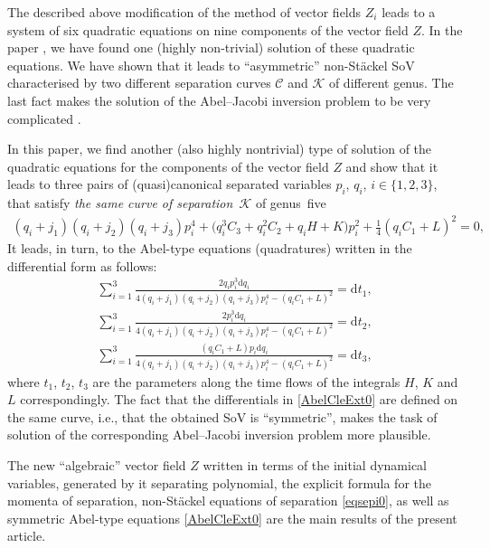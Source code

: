 \documentclass[pdftex]{sigma}
\numberwithin{equation}{section}
\begin{document}
 The described above modification of the method of vector fields $Z_i$ leads to a system of six quadratic equations on nine components of the vector field $Z$. In the paper \cite{SkrAsSoVExCle}, we have found one (highly non-trivial) solution of these quadratic equations. We have shown that it leads to ``asymmetric'' non-St\"ackel SoV characterised by two different separation curves $\mathcal{C}$ and $\mathcal{K}$ of different genus. The last fact makes the solution of the Abel--Jacobi inversion problem to be very complicated \cite{FedMagSkr2}.

 In this paper, we find another (also highly nontrivial) type of solution of the quadratic equations for the components of the vector field $Z$ and show that it leads to three pairs of (quasi)canonical separated variables $p_i$, $q_i$, $i\in \{1,2,3\}$, that
satisfy {\it the same curve of separation}~$\mathcal{K}$ of genus~five
\begin{gather}
(q_i+j_1)(q_i+j_2)(q_i+j_3) p_i^4+\big(q_i^3 C_3+q_i^2 C_2+ q_i H+K \big) p_i^2+ \frac{1}{4}(q_i C_1+L)^2=0,
\label{eqsepi0}
\end{gather}
It leads, in turn, to the Abel-type equations (quadratures) written in the differential form as follows:
\begin{subequations}\label{AbelCleExt0}
\begin{gather}
\sum\limits_{i=1}^3 \frac{2 q_i p_i^3 \mathrm{d}q_i}{ 4 (q_i+j_1) (q_i+j_2)(q_i+j_3) p^4_i-(q_i C_1+L)^2} = \mathrm{d} t_1,
\\
\sum\limits_{i=1}^3 \frac{2 p_i^3 \mathrm{d} q_i}{ 4 (q_i+j_1) (q_i+j_2)(q_i+j_3) p^4_i-(q_i C_1+L)^2} = \mathrm{d} t_2,
\\
\sum\limits_{i=1}^3 \frac{ (q_i C_1+L) p_i \mathrm{d} q_i}{ 4 (q_i+j_1) (q_i+j_2)(q_i+j_3) p^4_i-(q_i C_1+L)^2} = \mathrm{d} t_3,
\end{gather}
\end{subequations}
where $t_1$, $t_2$, $t_3$ are the parameters along the time flows of the integrals $H$, $K$ and $L$ correspondingly.
The fact that the differentials in \eqref{AbelCleExt0} are defined on the same curve, i.e., that the obtained SoV is ``symmetric'', makes the task of solution of the corresponding Abel--Jacobi inversion problem more plausible.

 The new ``algebraic'' vector field $Z$ written in terms of the initial dynamical variables, generated by it separating polynomial, the explicit formula for the momenta of separation, non-St\"ackel equations of separation \eqref{eqsepi0}, as well as symmetric Abel-type equations \eqref{AbelCleExt0} are the main results of the present article.
\end{document}
